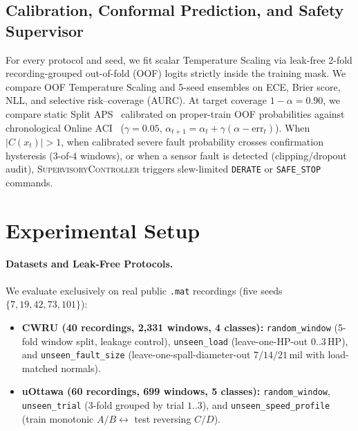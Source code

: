 \documentclass[10pt,twocolumn]{article}
\begin{document}
\subsection{Calibration, Conformal Prediction, and Safety Supervisor}
For every protocol and seed, we fit scalar Temperature Scaling via leak-free 2-fold recording-grouped out-of-fold (OOF) logits strictly inside the training mask. We compare OOF Temperature Scaling and 5-seed ensembles on ECE, Brier score, NLL, and selective risk--coverage (AURC). At target coverage $1-\alpha = 0.90$, we compare static Split APS~\cite{romano2020aps} calibrated on proper-train OOF probabilities against chronological Online ACI~\cite{gibbs2021aci} ($\gamma = 0.05$, $\alpha_{t+1} = \alpha_t + \gamma(\alpha - \text{err}_t)$). When $|C(x_t)| > 1$, when calibrated severe fault probability crosses confirmation hysteresis ($3$-of-$4$ windows), or when a sensor fault is detected (clipping/dropout audit), \textsc{SupervisoryController} triggers slew-limited \texttt{DERATE} or \texttt{SAFE\_STOP} commands.

\section{Experimental Setup}
\paragraph{Datasets and Leak-Free Protocols.}
We evaluate exclusively on real public \texttt{.mat} recordings (five seeds $\{7, 19, 42, 73, 101\}$):
\begin{itemize}
  \item \textbf{CWRU (40 recordings, 2,331 windows, 4 classes):} \texttt{random\_window} (5-fold window split, leakage control), \texttt{unseen\_load} (leave-one-HP-out $0..3$\,HP), and \texttt{unseen\_fault\_size} (leave-one-spall-diameter-out $7/14/21$\,mil with load-matched normals).
  \item \textbf{uOttawa (60 recordings, 699 windows, 5 classes):} \texttt{random\_window}, \texttt{unseen\_trial} (3-fold grouped by trial $1..3$), and \texttt{unseen\_speed\_profile} (train monotonic $A/B \leftrightarrow$ test reversing $C/D$).
\end{itemize}
\end{document}
